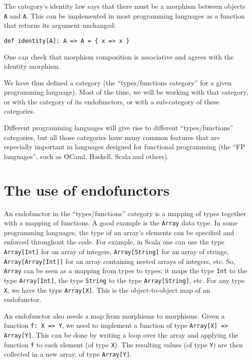 The category\textsf{'}s identity law says that there must be a morphism between
objects \lstinline!A! and \lstinline!A!. This can be implemented
in most programming languages as a function that returns its argument
unchanged:
\begin{lstlisting}
def identity[A]: A => A = { x => x }
\end{lstlisting}
One can check that morphism composition is associative and agrees
with the identity morphism.

We have thus defined a category (the \textsf{``}types/functions category\textsf{''}
for a given programming language). Most of the time, we will be working
with that category, or with the category of its endofunctors, or with
a sub-category of these categories.

Different programming languages will give rise to different \textsf{``}types/functions\textsf{''}
categories, but all those categories have many common features that
are especially important in languages designed for functional programming
(the \textsf{``}FP languages\textsf{''}, such as OCaml, Haskell, Scala and others).

\section{The use of endofunctors}

An endofunctor in the \textsf{``}types/functions\textsf{''} category is a mapping
of types together with a mapping of functions. A good example is the
\lstinline!Array! data type. In some programming languages, the type
of an array\textsf{'}s elements can be specified and enforced throughout the
code. For example, in Scala one can use the type \lstinline!Array[Int]!
for an array of integers, \lstinline!Array[String]! for an array
of strings, \lstinline!Array[Array[Int]]! for an array containing
nested arrays of integers, etc. So, \lstinline!Array! can be seen
as a mapping from types to types: it maps the type \lstinline!Int!
to the type \lstinline!Array[Int]!, the type \lstinline!String!
to the type \lstinline!Array[String]!, etc. For any type \lstinline!X!,
we have the type \lstinline!Array[X]!. This is the object-to-object
map of an endofunctor.

An endofunctor also needs a map from morphisms to morphisms. Given
a function \lstinline!f: X => Y!, we need to implement a function
of type \lstinline!Array[X] => Array[Y]!. This can be done by writing
a loop over the array and applying the function \lstinline!f! to
each element (of type \lstinline!X!). The resulting values (of type
\lstinline!Y!) are then collected in a new array, of type \lstinline!Array[Y]!.

